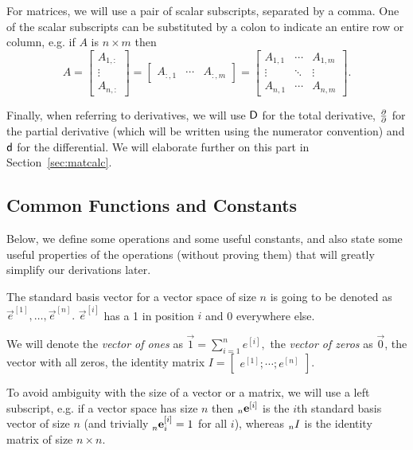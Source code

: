 \documentclass[pdflatex,sn-mathphys-num]{sn-jnl}%
\theoremstyle{thmstyleone}%
\theoremstyle{thmstyletwo}%
\theoremstyle{thmstylethree}%
\begin{document}
For matrices, we will use a pair of scalar subscripts, separated by a comma. One
of the scalar subscripts can be substituted by a colon to indicate an entire row
or column, e.g.  if \(A\) is \(n \times m\) then \[
    A
    = \left[\begin{array}{c}A_{1,:} \\ \vdots \\ A_{n,:}\end{array}\right]
    = [\begin{array}{ccc}A_{:,1} & \cdots & A_{:,m}\end{array}]
    = \left[\begin{array}{ccc}
        A_{1,1} & \cdots & A_{1,m} \\
        \vdots & \ddots & \vdots \\
        A_{n,1} & \cdots & A_{n,m}
    \end{array}\right]\!\!.
\]

Finally, when referring to derivatives, we will use \(\mathop{}\!\mathsf D\) for the total
derivative, \(\textstyle\frac{\partial\relax}{\partial\relax}\) for the partial derivative (which will
be written using the numerator convention) and \(\mathop{}\!\mathsf d\) for the differential.
We will elaborate further on this part in Section~\ref{sec:matcalc}.

\subsection{Common Functions and Constants}

Below, we define some operations and some useful constants, and also state some
useful properties of the operations (without proving them) that will greatly
simplify our derivations later.

The standard basis vector for a vector space of size \(n\) is going to be
denoted as \(\vec e^{[1]},\ldots,\vec e^{[n]}.\) \(\vec e^{[i]}\) has a 1 in
position \(i\) and 0 everywhere else.

We will denote the \emph{vector of ones} as \(\vec 1 = \sum_{i=1}^n e^{[i]},\)
the \emph{vector of zeros} as \(\vec 0\), the vector with all zeros, the identity
matrix \(I = [\begin{array}{ccc}e^{[1]}; \cdots; e^{[n]}\end{array}]\).

To avoid ambiguity with the size of a vector or a matrix, we will use a left
subscript, e.g. if a vector space has size \(n\) then \(\leftidx{_n}{\vec
e}{^{[i]}}\) is the \(i\)th standard basis vector of size \(n\) (and trivially
\(\leftidx{_n^{\vphantom{^{[i]}}}}{\vec e}{^{[i]}_i} = 1\) for all \(i\)),
whereas \(\leftidx{_n}I{}\) is the identity matrix of size \(n \times n.\)
\end{document}
